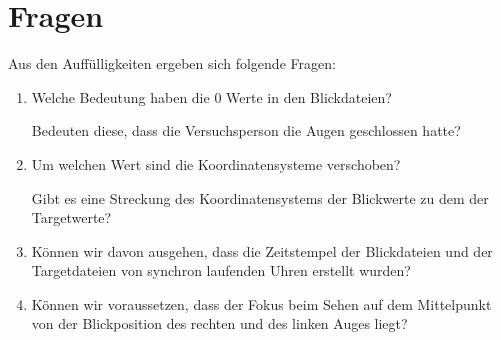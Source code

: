 \chapter{Fragen}
Aus den Auff\"ulligkeiten ergeben sich folgende Fragen:
\begin{enumerate}
	\item Welche Bedeutung haben die 0 Werte in den Blickdateien?
	
	Bedeuten diese, dass die Versuchsperson die Augen geschlossen hatte?
	\item Um welchen Wert sind die Koordinatensysteme verschoben?
	
	Gibt es eine Streckung des Koordinatensystems der Blickwerte zu dem der Targetwerte?
	\item K\"onnen wir davon ausgehen, dass die Zeitstempel der Blickdateien und der Targetdateien von synchron laufenden Uhren erstellt wurden?
	\item K\"onnen wir voraussetzen, dass der Fokus beim Sehen auf dem Mittelpunkt von der Blickposition des rechten und des linken Auges liegt?
\end{enumerate}